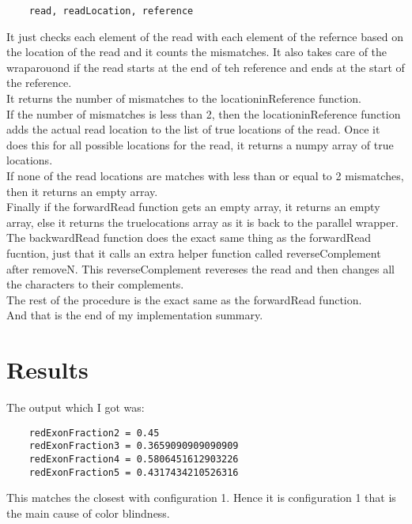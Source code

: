 \documentclass[12pt]{article}
\begin{document}
\begin{verbatim}
    read, readLocation, reference
\end{verbatim}
It just checks each element of the read with each element of the refernce based on the location of the read and it counts the mismatches. It also takes care of the wraparouond if the read starts at the end of teh reference and ends at the start of the reference.\\
It returns the number of mismatches to the locationinReference function.\\
If the number of mismatches is less than 2, then the locationinReference function adds the actual read location to the list of true locations of the read. Once it does this for all possible locations for the read, it returns a numpy array of true locations.\\
If none of the read locations are matches with less than or equal to 2 mismatches, then it returns an empty array.\\
Finally if the forwardRead function gets an empty array, it returns an empty array, else it returns the truelocations array as it is back to the parallel wrapper.\\
The backwardRead function does the exact same thing as the forwardRead fucntion, just that it calls an extra helper function called reverseComplement after removeN. This reverseComplement revereses the read and then changes all the characters to their complements.\\
The rest of the procedure is the exact same as the forwardRead function.\\
And that is the end of my implementation summary.

\section{Results}
The output which I got was:
\begin{verbatim}
    redExonFraction2 = 0.45 
    redExonFraction3 = 0.3659090909090909 
    redExonFraction4 = 0.5806451612903226
    redExonFraction5 = 0.4317434210526316
\end{verbatim}
This matches the closest with configuration 1. Hence it is configuration 1 that is the main cause of color blindness.
\end{document}

